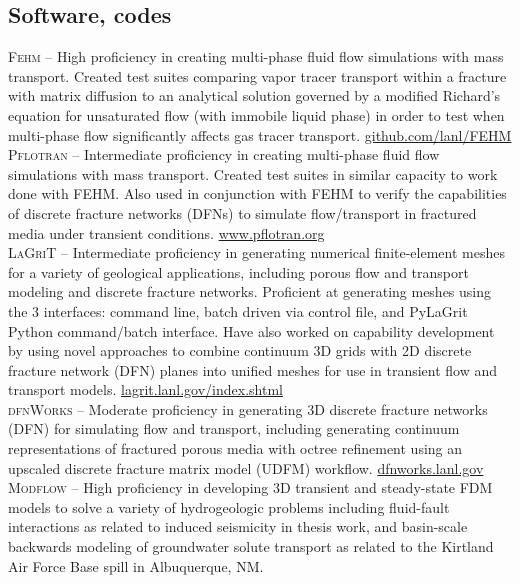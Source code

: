 \documentclass[11pt, letterpaper]{article}
\begin{document}
\subsection*{Software, codes}
\noindent
\textsc{Fehm} – High proficiency in creating multi-phase fluid flow simulations
with mass transport. Created test suites comparing vapor tracer transport
within a fracture with matrix diffusion to an analytical solution governed by a
modified Richard’s equation for unsaturated flow (with immobile liquid phase)
in order to test when multi-phase flow significantly affects gas tracer
transport. \href{https://github.com/lanl/FEHM}{github.com/lanl/FEHM} \\[5pt]
\textsc{Pflotran} – Intermediate proficiency in creating multi-phase fluid flow
simulations with mass transport. Created test suites in similar capacity to
work done with FEHM. Also used in conjunction with FEHM to verify the
capabilities of discrete fracture networks (DFNs) to simulate flow/transport in
fractured media under transient conditions.
\href{https://www.pflotran.org}{www.pflotran.org} \\[5pt]
\textsc{LaGriT} – Intermediate proficiency in generating numerical
finite-element meshes for a variety of geological applications, including
porous flow and transport modeling and discrete fracture networks. Proficient
at generating meshes using the 3 interfaces: command line, batch driven via
control file, and PyLaGrit Python command/batch interface. Have also worked on
capability development by using novel approaches to combine continuum 3D grids
with 2D discrete fracture network (DFN) planes into unified meshes for use in
transient flow and transport models.
\href{https://lagrit.lanl.gov/index.shtml}{lagrit.lanl.gov/index.shtml} \\[5pt]
\textsc{dfnWorks} – Moderate proficiency in generating 3D discrete fracture
networks (DFN) for simulating flow and transport, including generating
continuum representations of fractured porous media with octree refinement
using an upscaled discrete fracture matrix model (UDFM) workflow.
\href{https://dfnworks.lanl.gov}{dfnworks.lanl.gov} \\[5pt] 
\textsc{Modflow} – High proficiency in developing 3D transient and steady-state
FDM models to solve a variety of hydrogeologic problems including fluid-fault
interactions as related to induced seismicity in thesis work, and basin-scale
backwards modeling of groundwater solute transport as related to the Kirtland
Air Force Base spill in Albuquerque, NM.\\[5pt]
\end{document}

